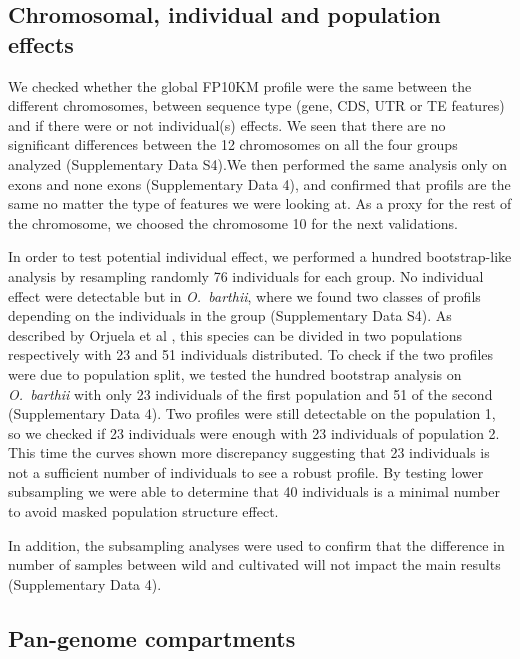 \documentclass[10pt,letterpaper]{article}
\begin{document}
\subsection*{Chromosomal, individual and population effects}
We checked whether the global FP10KM profile were the same between the different chromosomes, between sequence type (gene, CDS, UTR or TE features) and if there were or not individual(s) effects. We seen that there are no significant differences between the 12 chromosomes on all the four groups analyzed (Supplementary Data S4).We then performed the same analysis only on exons and none exons  (Supplementary Data 4), and confirmed that profils are the same no matter the type of features we were looking at. As a proxy for the rest of the chromosome, we choosed the chromosome 10 for the next validations.

In order to test potential individual effect, we performed a hundred bootstrap-like analysis by resampling randomly 76 individuals for each group. No individual effect were detectable but in \textit{O.~barthii}, where we found two classes of profils depending on the individuals in the group (Supplementary Data S4). As described by Orjuela et al \cite{Orjuela2014}, this species can be divided in two populations respectively with 23 and 51 individuals distributed.
To check if the two profiles were due to population split, we tested the hundred bootstrap analysis on \textit{O.~barthii} with only 23 individuals of the first population and 51 of the second (Supplementary Data 4).
Two profiles were still detectable on the population 1, so we checked if 23 individuals were enough with 23 individuals of population 2. This time the curves shown more discrepancy suggesting that 23 individuals is not a sufficient number of individuals to see a robust profile. By testing lower subsampling we were able to determine that 40 individuals is a minimal number to avoid masked population structure effect.

In addition, the subsampling analyses were used to confirm that the difference in number of samples between wild and cultivated will not impact the main results (Supplementary Data 4).


\subsection*{Pan-genome compartments}
\end{document}
